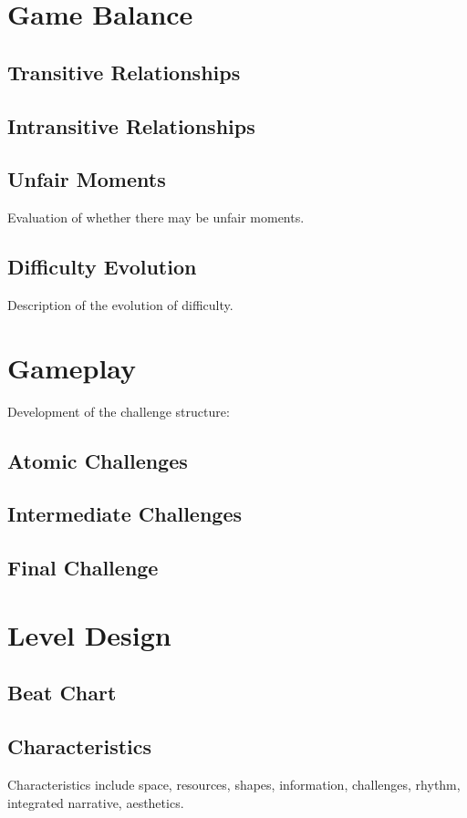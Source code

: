 \section{Game Balance}
\subsection{Transitive Relationships}
\subsection{Intransitive Relationships}
\subsection{Unfair Moments}
Evaluation of whether there may be unfair moments.
\subsection{Difficulty Evolution}
Description of the evolution of difficulty.

\section{Gameplay}
Development of the challenge structure:
\subsection{Atomic Challenges}
\subsection{Intermediate Challenges}
\subsection{Final Challenge}

\section{Level Design}
\subsection{Beat Chart}
\subsection{Characteristics}
Characteristics include space, resources, shapes, information, challenges, rhythm, integrated narrative, aesthetics.
